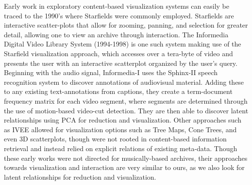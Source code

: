 \documentclass[a4paper,10pt,final]{ThesisStyle}
\begin{document}
Early work in exploratory content-based visualization systems can easily be traced to the 1990's where Starfields were commonly employed.  Starfields are interactive scatter-plots that allow for zooming, panning, and selection for greater detail, allowing one to view an archive through interaction.  The Informedia Digital Video Library System (1994-1998) \cite{Himmel1998,Christel1998} is one such system making use of the Starfield visualization approach, which accesses over a tera-byte of video and presents the user with an interactive scatterplot organized by the user's query.  Beginning with the audio signal, Informedia-I uses the Sphinx-II speech recognition system to discover annotations of audiovisual material.  Adding these to any existing text-annotations from captions, they create a term-document frequency matrix for each video segment, where segments are determined through the use of motion-based video-cut detection.  They are then able to discover latent relationships using PCA for reduction and visualization.  Other approaches such as IVEE \cite{Ahlberg1995} allowed for visualization options such as Tree Maps, Cone Trees, and even 3D scatterplots, though were not rooted in content-based information retrieval and instead relied on explicit relations of existing meta-data.  Though these early works were not directed for musically-based archives, their approaches towards visualization and interaction are very similar to ours, as we also look for latent relationships for reduction and visualization.
\end{document}
